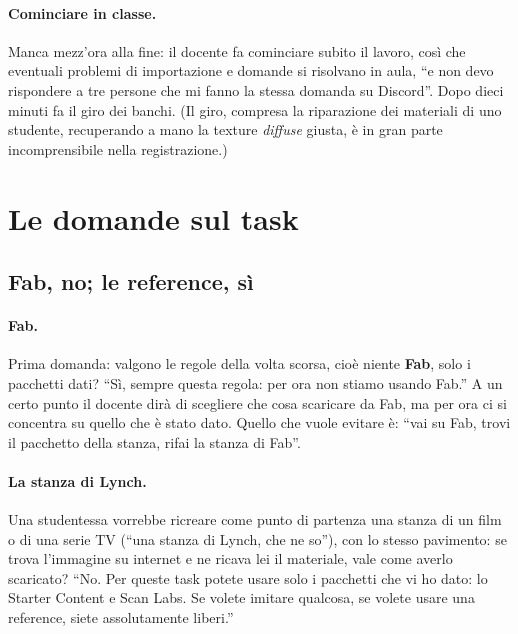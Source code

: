 \paragraph{Cominciare in classe.} Manca mezz'ora alla fine: il docente fa cominciare
subito il lavoro, così che eventuali problemi di importazione e domande si risolvano
in aula, ``e non devo rispondere a tre persone che mi fanno la stessa domanda su
Discord''. Dopo dieci minuti fa il giro dei banchi. (Il giro, compresa la riparazione
dei materiali di uno studente, recuperando a mano la texture \emph{diffuse} giusta,
è in gran parte incomprensibile nella registrazione.)

\section{Le domande sul task}
\label{gd14:sec:domande}

\subsection{Fab, no; le reference, sì}

\paragraph{Fab.} Prima domanda: valgono le regole della volta scorsa, cioè niente
\textbf{Fab}, solo i pacchetti dati? ``Sì, sempre questa regola: per ora non stiamo
usando Fab.'' A un certo punto il docente dirà di scegliere che cosa scaricare da
Fab, ma per ora ci si concentra su quello che è stato dato. Quello che vuole evitare
è: ``vai su Fab, trovi il pacchetto della stanza, rifai la stanza di Fab''.

\paragraph{La stanza di Lynch.} Una studentessa vorrebbe ricreare come punto di
partenza una stanza di un film o di una serie TV (``una stanza di Lynch, che ne
so''), con lo stesso pavimento: se trova l'immagine su internet e ne ricava lei il
materiale, vale come averlo scaricato? ``No. Per queste task potete usare solo i
pacchetti che vi ho dato: lo Starter Content e Scan Labs. Se volete imitare qualcosa,
se volete usare una reference, siete assolutamente liberi.''

